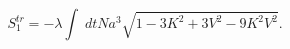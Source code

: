 \begin{equation}\label{tractn}
S^{tr}_1=-\lambda \int \; dt N a^3 \sqrt{1-3 K^2+3 V^2- 9 K^2V^2}.
\end{equation}

